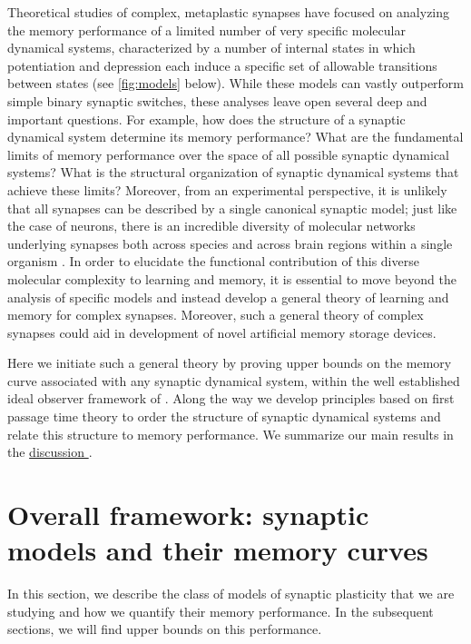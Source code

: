 Theoretical studies of complex, metaplastic synapses have focused on analyzing the memory performance of a limited number of very specific molecular dynamical systems, characterized by a number of internal states in which potentiation and depression each induce a specific set of allowable transitions between states (\eg see \cref{fig:models} below).
While these models can vastly outperform simple binary synaptic switches, these analyses leave open several deep and important questions.
For example, how does the structure of a synaptic dynamical system determine its memory performance?  What are the fundamental limits of memory performance over the space of all possible synaptic dynamical systems?
What is the structural organization of synaptic dynamical systems that achieve these limits?
Moreover, from an experimental perspective, it is unlikely that all synapses can be described by a single canonical synaptic model;  just like the case of neurons, there is an incredible diversity of molecular networks underlying synapses both across species and across brain regions within a single organism \cite{Emes2012synapserev}.
In order to elucidate the functional contribution of this diverse molecular complexity to learning and memory, it is essential to move beyond the analysis of specific models and instead develop a general theory of learning and memory for complex synapses.
Moreover, such a general theory of complex synapses could aid in development of novel artificial memory storage devices.  %

Here we initiate such a general theory by proving upper bounds on the memory curve associated with any synaptic dynamical system, within the well established ideal
observer framework of \cite{Fusi2005cascade,Fusi2007multistate,Barrett2008discrete}.
Along the way we develop principles based on first passage time theory to order the structure of synaptic dynamical systems and relate this structure to memory performance.
We summarize our main results in the \hyperref[sec:disc]{discussion }.








\section{Overall framework: synaptic models and their memory curves}\label{sec:setup}

In this section, we describe the class of models of synaptic plasticity that we are studying and how we quantify their memory performance.
In the subsequent sections, we will find upper bounds on this performance.

